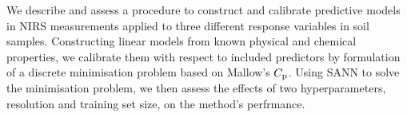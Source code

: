 We describe and assess a procedure to construct and calibrate predictive models in NIRS measurements applied to three different response variables in soil samples.
Constructing linear models from known physical and chemical properties, we calibrate them with respect to included predictors by formulation of a discrete minimisation problem based on Mallow's $C_{\mathrm{p}}$.
Using SANN to solve the minimisation problem, we then assess the effects of two hyperparameters, resolution and training set size, on the method's perfrmance.
